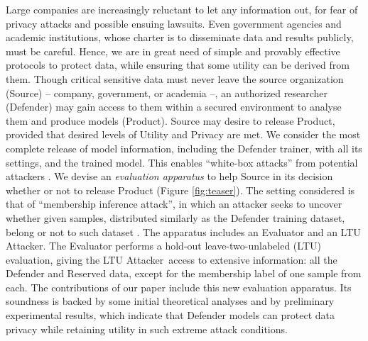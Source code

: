 \documentclass[letterpaper]{article}
\newcommand{\oracle}{LTU Attacker~}
\begin{document}
Large companies are increasingly reluctant to let any information out, for fear of privacy attacks and possible ensuing lawsuits. Even government agencies and academic institutions, whose charter is to disseminate data and results publicly, must be careful. Hence, we are in great need of simple and provably effective protocols to protect data, while ensuring that some utility can be derived from them. Though critical sensitive data must never leave the source organization (Source) -- company, government, or academia --, an authorized researcher (Defender) may gain access to them within a secured environment to analyse them and produce models (Product). Source may desire to release Product, provided that desired levels of Utility and Privacy are met.  We consider the most complete release of model information, including the Defender trainer, with all its settings, and the trained model. This enables ``white-box attacks'' from potential attackers \cite{nasr2019comprehensive}.
We devise an {\em evaluation apparatus} to help Source in its decision whether or not to release Product (Figure \ref{fig:teaser}). The setting considered is that of ``membership inference attack'', in which an attacker seeks to uncover whether given samples, distributed similarly as the Defender training dataset, belong or not to such dataset \cite{shokri2017membership}.
The apparatus includes an Evaluator and an LTU Attacker. The Evaluator performs a hold-out leave-two-unlabeled (LTU) evaluation, giving the \oracle access to extensive information: all the Defender and Reserved data, except for the membership label of one sample from each. The contributions of our paper include this new evaluation apparatus. Its soundness is backed by some initial theoretical analyses and by preliminary experimental results, which indicate that Defender models can protect data privacy while retaining utility in such extreme attack conditions.
\end{document}
